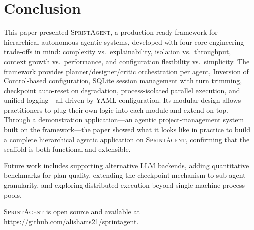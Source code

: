 \documentclass[11pt, a4paper]{article}
\newcommand{\sprintagent}{\textsc{SprintAgent}}
\newcommand{\ioc}{Inversion of Control}
\begin{document}
\section{Conclusion}
\label{sec:conclusion}

This paper presented \sprintagent{}, a production-ready framework for
hierarchical autonomous agentic systems, developed with four core
engineering trade-offs in mind: complexity vs.\ explainability,
isolation vs.\ throughput, context growth vs.\ performance, and
configuration flexibility vs.\ simplicity.  The framework provides
planner/designer/critic orchestration per agent, \ioc{}-based
configuration, SQLite session management with turn trimming, checkpoint
auto-reset on degradation, process-isolated parallel execution, and
unified logging---all driven by YAML configuration.  Its modular design
allows practitioners to plug their own logic into each module and extend
on top.  Through a demonstration application---an agentic
project-management system built on the framework---the paper showed what
it looks like in practice to build a complete hierarchical agentic
application on \sprintagent{}, confirming that the scaffold is both
functional and extensible.

Future work includes supporting alternative LLM backends, adding
quantitative benchmarks for plan quality, extending the checkpoint
mechanism to sub-agent granularity, and exploring distributed execution
beyond single-machine process pools.

\sprintagent{} is open source and available at
\url{https://github.com/alishams21/sprintagent}.



\end{document}
